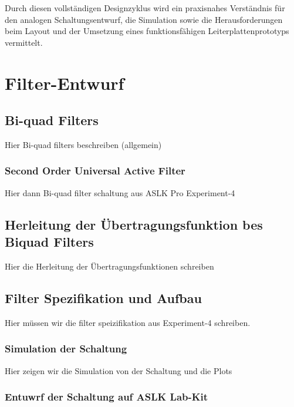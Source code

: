 \documentclass[
  ngerman,
  letterpaper,
  DIV=11]{scrreprt}
\begin{document}
Durch diesen vollständigen Designzyklus wird ein praxisnahes Verständnis
für den analogen Schaltungsentwurf, die Simulation sowie die
Herausforderungen beim Layout und der Umsetzung eines funktionsfähigen
Leiterplattenprototyps vermittelt.

\chapter{Filter-Entwurf}\label{filter-entwurf}

\section{Bi-quad Filters}\label{bi-quad-filters}

Hier Bi-quad filters beschreiben (allgemein)

\subsection{Second Order Universal Active
Filter}\label{second-order-universal-active-filter}

Hier dann Bi-quad filter schaltung aus ASLK Pro Experiment-4

\section{Herleitung der Übertragungsfunktion bes Biquad
Filters}\label{herleitung-der-uxfcbertragungsfunktion-bes-biquad-filters}

Hier die Herleitung der Übertragungsfunktionen schreiben

\section{Filter Spezifikation und
Aufbau}\label{filter-spezifikation-und-aufbau}

Hier müssen wir die filter speizifikation aus Experiment-4 schreiben.

\subsection{Simulation der Schaltung}\label{simulation-der-schaltung}

Hier zeigen wir die Simulation von der Schaltung und die Plots

\subsection{Entuwrf der Schaltung auf ASLK
Lab-Kit}\label{entuwrf-der-schaltung-auf-aslk-lab-kit}
\end{document}

